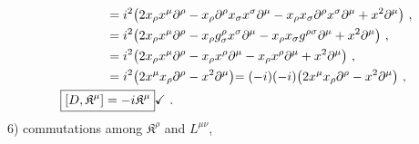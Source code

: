 \documentclass[12pt,a4paper]{report}
\begin{document}
\begin{align*}
    &=i^2\bigl(2x_{{\rho}}x^{{\mu}}\partial^{{\rho}}-x_{{\rho}}\partial^{{\rho}}x_{{\sigma}}x^{{\sigma}}\partial^{{\mu}}-x_{{\rho}}x_{{\sigma}}\partial^{{\rho}}x^{{\sigma}}\partial^{{\mu}}+x^2\partial^{{\mu}}\bigl)~,\\
    &=i^2\bigl(2x_{{\rho}}x^{{\mu}}\partial^{{\rho}}-x_{{\rho}}g^{{\rho}}_{{\sigma}}x^{{\sigma}}\partial^{{\mu}}-x_{{\rho}}x_{{\sigma}}g^{{\rho}{\sigma}}\partial^{{\mu}}+x^2\partial^{{\mu}}\bigl)\nonumber~,\\
    &=i^2\bigl(2x_{{\rho}}x^{{\mu}}\partial^{{\rho}}-x_{{\rho}}x^{{\rho}}\partial^{{\mu}}-x_{{\rho}}x^{{\rho}}\partial^{{\mu}}+x^2\partial^{{\mu}}\bigl)~,\\
    &=i^2\bigl(2x^{{\mu}}x_{{\rho}}\partial^{{\rho}}-x^2\partial^{{\mu}}\bigl)=(-i)(-i)\bigl(2x^{{\mu}}x_{{\rho}}\partial^{{\rho}}-x^2\partial^{{\mu}}\bigl)~,\\
    \Aboxed{\left[D, \mathfrak{K}^{{\mu}}\right]&=-i\mathfrak{K}^{{\mu}}}\checkmark~.
\end{align*}
6) commutations among $\mathfrak{K}^{{\rho}}$ and $L^{{\mu}{\nu}}$,
\end{document}
